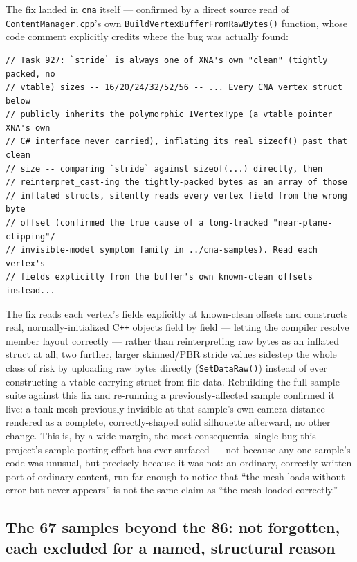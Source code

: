 The fix landed in \texttt{cna} itself --- confirmed by a direct source read of
\texttt{ContentManager.cpp}'s own
\texttt{BuildVertexBuffer\allowbreak{}FromRawBytes()} function, whose code comment
explicitly credits where the bug was actually found:

\begin{lstlisting}
// Task 927: `stride` is always one of XNA's own "clean" (tightly packed, no
// vtable) sizes -- 16/20/24/32/52/56 -- ... Every CNA vertex struct below
// publicly inherits the polymorphic IVertexType (a vtable pointer XNA's own
// C# interface never carried), inflating its real sizeof() past that clean
// size -- comparing `stride` against sizeof(...) directly, then
// reinterpret_cast-ing the tightly-packed bytes as an array of those
// inflated structs, silently reads every vertex field from the wrong byte
// offset (confirmed the true cause of a long-tracked "near-plane-clipping"/
// invisible-model symptom family in ../cna-samples). Read each vertex's
// fields explicitly from the buffer's own known-clean offsets instead...
\end{lstlisting}

The fix reads each vertex's fields explicitly at known-clean offsets and constructs real,
normally-initialized C\texttt{++} objects field by field --- letting the compiler resolve
member layout correctly --- rather than reinterpreting raw bytes as an inflated struct at
all; two further, larger skinned/PBR stride values sidestep the whole class of risk by
uploading raw bytes directly (\texttt{SetDataRaw()}) instead of ever constructing a
vtable-carrying struct from file data. Rebuilding the full sample suite against this fix and
re-running a previously-affected sample confirmed it live: a tank mesh previously invisible
at that sample's own camera distance rendered as a complete, correctly-shaped solid
silhouette afterward, no other change. This is, by a wide margin, the most consequential
single bug this project's sample-porting effort has ever surfaced --- not because any one
sample's code was unusual, but precisely because it was not: an ordinary, correctly-written
port of ordinary content, run far enough to notice that ``the mesh loads without error but
never appears'' is not the same claim as ``the mesh loaded correctly.''

\subsection{The 67 samples beyond the 86: not forgotten, each excluded for a named, structural reason}

